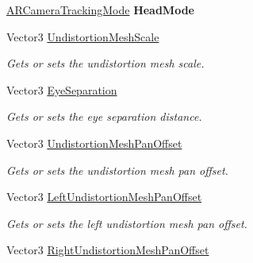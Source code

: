 \begin{DoxyCompactItemize}
\mbox{\label{class_ximmerse_1_1_slide_in_s_d_k_1_1_a_r_camera_a7cbb5c6a9989452db703e8374df30410}} 
\mbox{\hyperlink{namespace_ximmerse_1_1_slide_in_s_d_k_afe4bdc1d1705000eb90aaef87e0fa464}{A\+R\+Camera\+Tracking\+Mode}} {\bfseries Head\+Mode}
\item 
Vector3 \mbox{\hyperlink{class_ximmerse_1_1_slide_in_s_d_k_1_1_a_r_camera_a748884454e278d6c0dd93f80664786f6}{Undistortion\+Mesh\+Scale}}
\begin{DoxyCompactList}\small\item\em Gets or sets the undistortion mesh scale. \end{DoxyCompactList}\item 
Vector3 \mbox{\hyperlink{class_ximmerse_1_1_slide_in_s_d_k_1_1_a_r_camera_a541041062fc34fb2037d9bb2d8899b7b}{Eye\+Separation}}
\begin{DoxyCompactList}\small\item\em Gets or sets the eye separation distance. \end{DoxyCompactList}\item 
Vector3 \mbox{\hyperlink{class_ximmerse_1_1_slide_in_s_d_k_1_1_a_r_camera_a45c0a12d7fa088abd952e71e6824b5b7}{Undistortion\+Mesh\+Pan\+Offset}}
\begin{DoxyCompactList}\small\item\em Gets or sets the undistortion mesh pan offset. \end{DoxyCompactList}\item 
Vector3 \mbox{\hyperlink{class_ximmerse_1_1_slide_in_s_d_k_1_1_a_r_camera_a9843d084846d01979c5b711b3f8e704f}{Left\+Undistortion\+Mesh\+Pan\+Offset}}
\begin{DoxyCompactList}\small\item\em Gets or sets the left undistortion mesh pan offset. \end{DoxyCompactList}\item 
Vector3 \mbox{\hyperlink{class_ximmerse_1_1_slide_in_s_d_k_1_1_a_r_camera_a79e2dd7db0f502ab44497a6944b000b9}{Right\+Undistortion\+Mesh\+Pan\+Offset}}

\end{DoxyCompactItemize}
